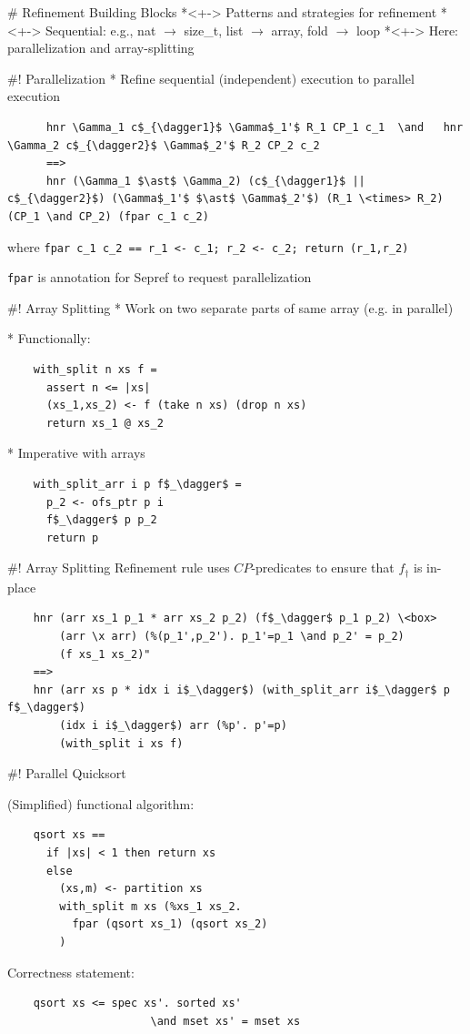 \documentclass[fleqn]{beamer}
\begin{document}
# Refinement Building Blocks
  *<+-> Patterns and strategies for refinement
  *<+-> Sequential: e.g., nat $\to$ size\_t, list $\to$ array, fold $\to$ loop
  *<+-> Here: parallelization and array-splitting

#! Parallelization
  * Refine sequential (independent) execution to parallel execution
    \small
    \begin{lstlisting}
      hnr \Gamma_1 c$_{\dagger1}$ \Gamma$_1'$ R_1 CP_1 c_1  \and   hnr \Gamma_2 c$_{\dagger2}$ \Gamma$_2'$ R_2 CP_2 c_2
      ==>
      hnr (\Gamma_1 $\ast$ \Gamma_2) (c$_{\dagger1}$ || c$_{\dagger2}$) (\Gamma$_1'$ $\ast$ \Gamma$_2'$) (R_1 \<times> R_2) (CP_1 \and CP_2) (fpar c_1 c_2)
    \end{lstlisting}

  where
    \lstinline{fpar c_1 c_2 == r_1 <- c_1; r_2 <- c_2; return (r_1,r_2)}

    \lstinline{fpar} is annotation for Sepref to request parallelization

#! Array Splitting
  * Work on two separate parts of same array (e.g. in parallel)

  * Functionally:
  \begin{lstlisting}
    with_split n xs f =
      assert n <= |xs|
      (xs_1,xs_2) <- f (take n xs) (drop n xs)
      return xs_1 @ xs_2
  \end{lstlisting}

  * Imperative with arrays
  \begin{lstlisting}
    with_split_arr i p f$_\dagger$ =
      p_2 <- ofs_ptr p i
      f$_\dagger$ p p_2
      return p
  \end{lstlisting}


#! Array Splitting
  Refinement rule uses $CP$-predicates to ensure that $f_\dagger$ is in-place


  \begin{lstlisting}
    hnr (arr xs_1 p_1 * arr xs_2 p_2) (f$_\dagger$ p_1 p_2) \<box>
        (arr \x arr) (%(p_1',p_2'). p_1'=p_1 \and p_2' = p_2)
        (f xs_1 xs_2)"
    ==>
    hnr (arr xs p * idx i i$_\dagger$) (with_split_arr i$_\dagger$ p f$_\dagger$)
        (idx i i$_\dagger$) arr (%p'. p'=p)
        (with_split i xs f)
  \end{lstlisting}


#! Parallel Quicksort
  \begin{minipage}[t]{.49\textwidth}
  (Simplified) functional algorithm:
  \begin{lstlisting}
    qsort xs ==
      if |xs| < 1 then return xs
      else
        (xs,m) <- partition xs
        with_split m xs (%xs_1 xs_2.
          fpar (qsort xs_1) (qsort xs_2)
        )
  \end{lstlisting}
  \end{minipage}
  \begin{minipage}[t]{.49\textwidth}
  Correctness statement:
  \begin{lstlisting}
    qsort xs <= spec xs'. sorted xs'
                      \and mset xs' = mset xs
  \end{lstlisting}
  \end{minipage}
\end{document}
